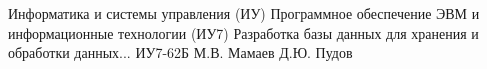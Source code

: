\makecourseworktitle
{Информатика и системы управления (ИУ)}                %
{Программное обеспечение ЭВМ и информационные технологии (ИУ7)} %
{Разработка базы данных для хранения и обработки данных...}     %
{ИУ7-62Б}                                              %
{М.В. Мамаев}                                          %
{Д.Ю. Пудов}                                           %
{}                                                     %
{}                                                     %